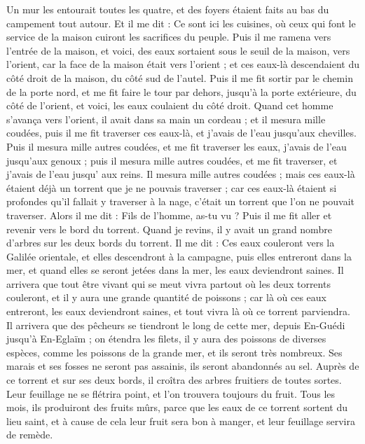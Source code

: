 \begin{multicols}{2}
Un mur les entourait toutes les quatre, et des foyers étaient faits au bas du campement tout autour.
Et il me dit : Ce sont ici les cuisines, où ceux qui font le service de la maison cuiront les sacrifices du peuple.
\VerseOne{}Puis il me ramena vers l'entrée de la maison, et voici, des eaux sortaient sous le seuil de la maison, vers l'orient, car la face de la maison était vers l'orient ; et ces eaux-là descendaient du côté droit de la maison, du côté sud de l'autel.
Puis il me fit sortir par le chemin de la porte nord, et me fit faire le tour par dehors, jusqu'à la porte extérieure, du côté de l’orient, et voici, les eaux coulaient du côté droit.
Quand cet homme s’avança vers l'orient, il avait dans sa main un cordeau ; et il mesura mille coudées, puis il me fit traverser ces eaux-là, et j’avais de l’eau jusqu'aux chevilles.
Puis il mesura mille autres coudées, et me fit traverser les eaux, j’avais de l’eau jusqu'aux genoux ; puis il mesura mille autres coudées, et me fit traverser, et j’avais de l’eau  jusqu’ aux reins.
Il mesura mille autres coudées ; mais ces eaux-là étaient déjà un torrent que je ne pouvais traverser ; car ces eaux-là étaient si profondes qu'il fallait y traverser à la nage, c’était un torrent que l'on ne pouvait traverser.
Alors il me dit : Fils de l’homme, as-tu vu ? Puis il me fit aller et revenir vers le bord du torrent.
Quand je revins, il y avait un grand nombre d'arbres sur les deux bords du torrent.
Il me dit : Ces eaux couleront vers la Galilée orientale, et elles descendront à la campagne, puis elles entreront dans la mer, et quand elles se seront jetées dans la mer, les eaux deviendront saines.
Il arrivera que tout être vivant qui se meut vivra partout où les deux torrents couleront, et il y aura une grande quantité de poissons ; car là où ces eaux entreront, les eaux deviendront saines, et tout vivra là où ce torrent parviendra.
Il arrivera que des pêcheurs se tiendront le long de cette mer, depuis En-Guédi jusqu’à En-Eglaïm ; on étendra les filets, il y aura des poissons de diverses espèces, comme les poissons de la grande mer, et ils seront très nombreux.
Ses marais et ses fosses ne seront pas assainis, ils seront abandonnés au sel.
Auprès de ce torrent et sur ses deux bords, il croîtra des arbres fruitiers de toutes sortes. Leur feuillage ne se flétrira point, et l'on trouvera toujours du fruit. Tous les mois, ils produiront des fruits mûrs, parce que les eaux de ce torrent sortent du lieu saint, et à cause de cela leur fruit sera bon à manger, et leur feuillage servira de remède.

\end{multicols}
